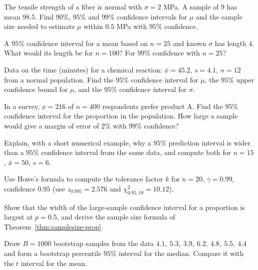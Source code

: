 \begin{exercise}
The tensile strength of a fiber is normal with $\sigma=2$ MPa. A sample of $9$ has mean $98.5$. Find $90\%$, $95\%$ and $99\%$ confidence intervals for $\mu$ and the sample size needed to estimate $\mu$ within $0.5$ MPa with $95\%$ confidence.
\end{exercise}

\begin{exercise}
A $95\%$ confidence interval for a mean based on $n=25$ and known $\sigma$ has length $4$. What would its length be for $n=100$? For $99\%$ confidence with $n=25$?
\end{exercise}

\begin{exercise}
Data on the time (minutes) for a chemical reaction: $\bar{x}=45.2$, $s=4.1$, $n=12$ from a normal population. Find the $95\%$ confidence interval for $\mu$, the $95\%$ upper confidence bound for $\mu$, and the $95\%$ confidence interval for $\sigma$.
\end{exercise}

\begin{exercise}
In a survey, $x=216$ of $n=400$ respondents prefer product A. Find the $95\%$ confidence interval for the proportion in the population. How large a sample would give a margin of error of $2\%$ with $99\%$ confidence?
\end{exercise}

\begin{exercise}
Explain, with a short numerical example, why a $95\%$ prediction interval is wider than a $95\%$ confidence interval from the same data, and compute both for $n=15$, $\bar{x}=50$, $s=6$.
\end{exercise}

\begin{exercise}
Use Howe's formula to compute the tolerance factor $k$ for $n=20$, $\gamma=0.99$, confidence $0.95$ (use $z_{0.995}=2.576$ and $\chi^2_{0.95,19}=10.12$).
\end{exercise}

\begin{exercise}
Show that the width of the large-sample confidence interval for a proportion is largest at $p=0.5$, and derive the sample size formula of Theorem~\ref{thm:samplesize-prop}.
\end{exercise}

\begin{exercise}
Draw $B=1000$ bootstrap samples from the data $4.1,\ 5.3,\ 3.9,\ 6.2,\ 4.8,\ 5.5,\ 4.4$ and form a bootstrap percentile $95\%$ interval for the median. Compare it with the $t$ interval for the mean.
\end{exercise}
